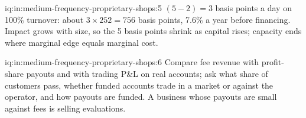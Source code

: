 \begin{solution}{iq:in:medium-frequency-proprietary-shops:5}
$(5-2)=3$ basis points a day on 100\% turnover: about $3\times252=756$ basis points, 7.6\% a year before financing. Impact
grows with size, so the 5 basis points shrink as capital rises; capacity ends where marginal edge equals marginal cost.
\end{solution}

\begin{solution}{iq:in:medium-frequency-proprietary-shops:6}
Compare fee revenue with profit-share payouts and with trading P\&L on real accounts; ask what share of customers pass,
whether funded accounts trade in a market or against the operator, and how payouts are funded. A business whose payouts
are small against fees is selling evaluations.
\end{solution}
